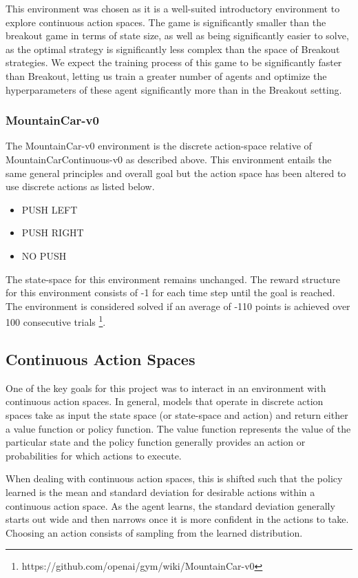 \documentclass[conference]{IEEEtran}
\begin{document}
This environment was chosen as it is a well-suited introductory environment to explore continuous action spaces.
The game is significantly smaller than the breakout game in terms of state size, as well as being significantly easier to solve, as the optimal strategy is significantly less complex than the space of Breakout strategies.
We expect the training process of this game to be significantly faster than Breakout, letting us train a greater number of agents and optimize the hyperparameters of these agent significantly more than in the Breakout setting.

\subsubsection{MountainCar-v0}
The MountainCar-v0 environment is the discrete action-space relative of MountainCarContinuous-v0 as described above.
This environment entails the same general principles and overall goal but the action space has been altered to use discrete actions as listed below.

\begin{itemize}
    \item PUSH LEFT
    \item PUSH RIGHT
    \item NO PUSH
\end{itemize}

The state-space for this environment remains unchanged.
The reward structure for this environment consists of -1 for each time step until the goal is reached.
The environment is considered solved if an average of -110 points is achieved over 100 consecutive trials \footnote{https://github.com/openai/gym/wiki/MountainCar-v0}.

\subsection{Continuous Action Spaces}
One of the key goals for this project was to interact in an environment with continuous action spaces.
In general, models that operate in discrete action spaces take as input the state space (or state-space and action) and return either a value function or policy function.
The value function represents the value of the particular state and the policy function generally provides an action or probabilities for which actions to execute.

When dealing with continuous action spaces, this is shifted such that the policy learned is the mean and standard deviation for desirable actions within a continuous action space.
As the agent learns, the standard deviation generally starts out wide and then narrows once it is more confident in the actions to take.
Choosing an action consists of sampling from the learned distribution.
\end{document}
